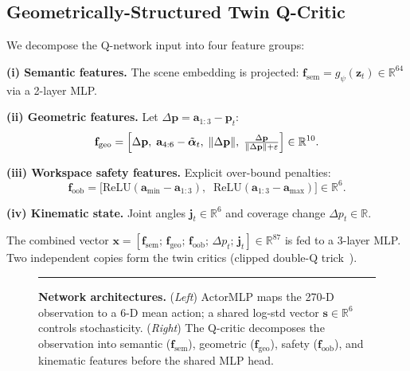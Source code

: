 \documentclass{article}
\begin{document}
\subsection{Geometrically-Structured Twin Q-Critic}
\label{sec:critic}

We decompose the Q-network input into four feature groups:

\textbf{(i) Semantic features.} The scene embedding is projected: $\mathbf{f}_\text{sem} = g_\psi(\mathbf{z}_t) \in \mathbb{R}^{64}$ via a 2-layer MLP.

\textbf{(ii) Geometric features.} Let $\Delta\mathbf{p} = \mathbf{a}_{1:3} - \mathbf{p}_t$:
\begin{equation}
  \mathbf{f}_\text{geo} = \Bigl[
    \Delta\mathbf{p},\;
    \mathbf{a}_{4:6} - \tilde{\bm{\alpha}}_t,\;
    \|\Delta\mathbf{p}\|,\;
    \tfrac{\Delta\mathbf{p}}{\|\Delta\mathbf{p}\|+\varepsilon}
  \Bigr] \in \mathbb{R}^{10}.
  \label{eq:geo_feats}
\end{equation}

\textbf{(iii) Workspace safety features.} Explicit over-bound penalties:
\begin{equation}
  \mathbf{f}_\text{oob} = \bigl[
    \mathrm{ReLU}(\mathbf{a}_{\min} - \mathbf{a}_{1:3}),\;\;
    \mathrm{ReLU}(\mathbf{a}_{1:3} - \mathbf{a}_{\max})
  \bigr] \in \mathbb{R}^{6}.
\end{equation}

\textbf{(iv) Kinematic state.} Joint angles $\mathbf{j}_t \in \mathbb{R}^6$ and coverage change $\Delta p_t \in \mathbb{R}$.

The combined vector $\mathbf{x} = [\mathbf{f}_\text{sem};\, \mathbf{f}_\text{geo};\, \mathbf{f}_\text{oob};\, \Delta p_t;\, \mathbf{j}_t] \in \mathbb{R}^{87}$ is fed to a 3-layer MLP. Two independent copies form the twin critics (clipped double-Q trick~\citep{fujimoto2018td3}).

\begin{figure}[htbp]
  \centering
  \rule{0.92\textwidth}{6cm}   %
  \caption{\textbf{Network architectures.} (\emph{Left}) ActorMLP maps the 270-D observation to a 6-D mean action; a shared log-std vector $\mathbf{s}\in\mathbb{R}^6$ controls stochasticity. (\emph{Right}) The Q-critic decomposes the observation into semantic ($\mathbf{f}_\text{sem}$), geometric ($\mathbf{f}_\text{geo}$), safety ($\mathbf{f}_\text{oob}$), and kinematic features before the shared MLP head.}
  \label{fig:architectures}
\end{figure}
\end{document}
